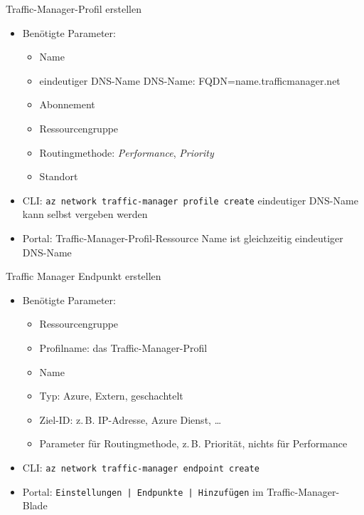 \begin{flashcard}[Definition]{Traffic-Manager-Profil erstellen}
        \begin{itemize}
            \item Benötigte Parameter:
                \begin{itemize}
                    \item Name
                    \item eindeutiger DNS-Name\newline
                        DNS-Name: FQDN=name.trafficmanager.net
                    \item Abonnement
                    \item Ressourcengruppe
                    \item Routingmethode: \emph{Performance}, \emph{Priority}
                    \item Standort
                \end{itemize}
            \item CLI: \texttt{az network traffic-manager profile create}\newline
                eindeutiger DNS-Name kann selbst vergeben werden
            \item Portal: Traffic-Manager-Profil-Ressource\newline
                Name ist gleichzeitig eindeutiger DNS-Name
        \end{itemize}
\end{flashcard}

\begin{flashcard}[Definition]{Traffic Manager Endpunkt erstellen}
    \begin{itemize}
        \item Benötigte Parameter:
            \begin{itemize}
                \item Ressourcengruppe
                \item Profilname: das Traffic-Manager-Profil
                \item Name
                \item Typ: Azure, Extern, geschachtelt
                \item Ziel-ID: z.\,B. IP-Adresse, Azure Dienst, \ldots
                \item Parameter für Routingmethode, z.\,B. Priorität, nichts für Performance
            \end{itemize}
        \item CLI: \texttt{az network traffic-manager endpoint create}
        \item Portal: \texttt{Einstellungen | Endpunkte | Hinzufügen} im Traffic-Manager-Blade
    \end{itemize}
\end{flashcard}
